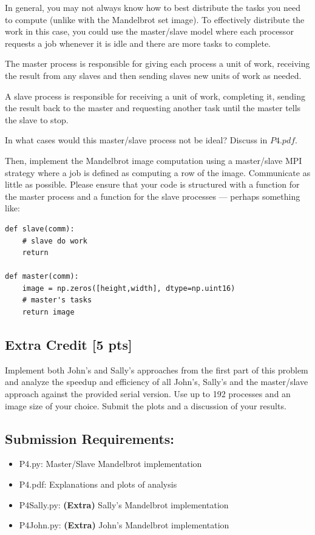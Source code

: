 \documentclass[12pt]{article}
\begin{document}
In general, you may not always know how to best distribute the tasks you need to compute (unlike with the Mandelbrot set image).  To effectively distribute the work in this case, you could use the master/slave model where each processor requests a job whenever it is idle and there are more tasks to complete.  

The master process is responsible for giving each process a unit of work, receiving the result from any slaves and then sending slaves new units of work as needed. 

A slave process is responsible for receiving a unit of work, completing it, sending the result back to the master and requesting another task until the master tells the slave to stop. 

In what cases would this master/slave process not be ideal?  Discuss in $P4.pdf$. 

Then, implement the Mandelbrot image computation using a master/slave MPI strategy where a job is defined as computing a row of the image.  Communicate as little as possible.  Please ensure that your code is structured with a function for the master process and a function for the slave processes --- perhaps something like: 

\begin{lstlisting}
def slave(comm):
	# slave do work
	return

def master(comm):
	image = np.zeros([height,width], dtype=np.uint16)
	# master's tasks
 	return image
\end{lstlisting}

\subsection*{Extra Credit [5 pts]}
Implement both John's and Sally's approaches from the first part of this problem and analyze the speedup and efficiency of all John's, Sally's and the master/slave approach against the provided serial version.  Use up to 192 processes and an image size of your choice.  Submit the plots and a discussion of your results.

\subsection*{Submission Requirements:}
\begin{itemize}
\item P4.py: Master/Slave Mandelbrot implementation
\item P4.pdf: Explanations and plots of analysis
\item P4Sally.py: \textbf{(Extra)} Sally's Mandelbrot implementation
\item P4John.py: \textbf{(Extra)} John's Mandelbrot implementation
\end{itemize}
\end{document}
